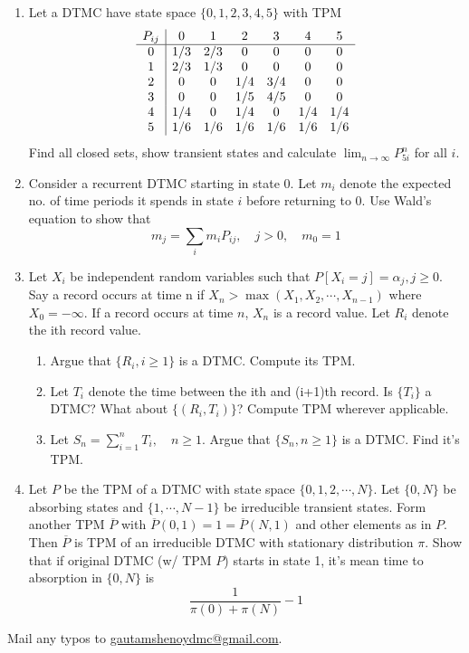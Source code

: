 \documentclass[a4paper,10pt]{article}
\begin{document}
\begin{enumerate}
	\item Let a DTMC have state space $\{0,1,2,3,4,5\}$ with TPM
	\[
	 \begin{array}{c| c c c c c c}
	P_{ij}&0&1&2&3&4&5 \\ \hline
	0&1/3 & 2/3 & 0& 0&0&0 \\
	1&2/3&1/3&0&0&0&0 \\
	2&0&0&1/4&3/4&0&0\\
	3&0&0&1/5&4/5&0&0\\
	4&1/4&0 &1/4 &0 & 1/4 & 1/4 \\
	5&1/6 &1/6 &1/6 &1/6 &1/6 &1/6 	
	\end{array} \]
		Find all closed sets, show transient states and calculate $\lim_{n \to \infty}P_{5i}^n$ for all $i$.
		
		\item Consider a recurrent DTMC starting in state $0$. Let $m_i$ denote the expected no. of time periods it spends in state $i$ before returning to $0$. Use Wald's equation to show that \[ m_j = \sum_i m_i P_{ij}, \quad j >0,\quad  m_0 = 1\]
		
		\item Let $X_i$ be independent random variables such that $P[X_i = j] = \alpha_j, j \geq 0$. Say a record occurs at time n if $X_n > \max(X_1,X_2, \cdots, X_{n-1})$ where $X_0 = -\infty$. If a record occurs at time $n$, $X_n$ is a record value. Let $R_i$ denote the ith record value.
		\begin{enumerate}
			\item Argue that $\{ R_i, i \geq 1\}$ is a DTMC. Compute its TPM. 
			\item Let $T_i$ denote the time between the ith and (i+1)th record. Is $\{T_i\}$ a DTMC? What about $\{(R_i,T_i)\}$? Compute TPM wherever applicable.
			\item Let $S_n = \sum_{i=1}^n T_i, \quad n\geq 1$. Argue that $\{S_n, n \geq 1\}$ is a DTMC. Find it's TPM.
		\end{enumerate}
		
		\item Let $P$ be the TPM of a DTMC with state space $\{0,1,2,\cdots, N\}$. Let $\{0,N\}$ be absorbing states and $\{1,\cdots, N-1\}$ be irreducible transient states. Form another TPM $\overline{P}$ with $\overline{P}(0,1) = 1 = \overline{P}(N,1)$ and other elements as in $P$. Then $\overline{P}$ is TPM of an irreducible DTMC with stationary distribution $\pi$. Show that if original DTMC (w/ TPM $P$) starts in state 1, it's mean time to absorption in $\{0,N\}$ is \[\frac{1}{\pi(0) +\pi(N)} -1\]
\end{enumerate}

Mail any typos to \url{gautamshenoydmc@gmail.com}.
\end{document}
